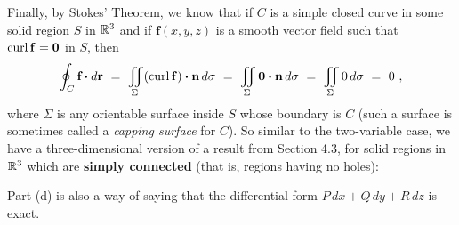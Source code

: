 Finally, by Stokes' Theorem, we know that if $C$ is a simple closed curve in some solid region $S$ in $\mathbb{R}^{3}$ and if
$\mathbf{f}(x,y,z)$ is a smooth vector field such that $\mathop{\mathrm{curl}}\nolimits\mathbf{f} = \mathbf{0}$ in $S$, then
\begin{displaymath}
 \oint_{C} \textbf{f} \bm{\cdot} d\textbf{r} ~=~ \iint\limits_{\Sigma} (\mathop{\mathrm{curl}}\nolimits\mathbf{f}) \bm{\cdot} \mathbf{n}\,d\sigma ~=~
   \iint\limits_{\Sigma} \mathbf{0} \bm{\cdot} \mathbf{n}\,d\sigma ~=~ \iint\limits_{\Sigma} 0\,d\sigma ~=~ 0 ~,
\end{displaymath}
where $\Sigma$ is any orientable surface inside $S$ whose boundary is $C$ (such a surface is sometimes called a
\emph{capping surface} for $C$).
So similar to the two-variable case, we have a three-dimensional version of a result from Section 4.3, for solid regions
in $\mathbb{R}^{3}$ which are \textbf{simply connected} 
(that is, regions having no holes):

\medskip
{}\medskip

\par\noindent Part (d) is also a way of saying that the differential form $P\,dx + Q\,dy + R\,dz$ is exact.
 
